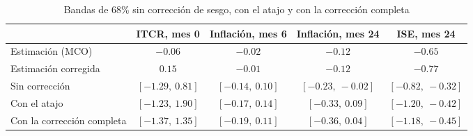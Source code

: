 \begin{table}[H]
\centering
\caption{Bandas de 68\% sin corrección de sesgo, con el atajo y con la corrección completa}
\label{tab:D_sesgo_completo}
\small
\begin{tabular}{@{}lcccc@{}}
\toprule
 & ITCR, mes 0 & Inflación, mes 6 & Inflación, mes 24 & ISE, mes 24 \\
\midrule
Estimación (MCO) & $-0.06$ & $-0.02$ & $-0.12$ & $-0.65$ \\
Estimación corregida & $0.15$ & $-0.01$ & $-0.12$ & $-0.77$ \\
\midrule
Sin corrección & $[-1.29,\ 0.81]$ & $[-0.14,\ 0.10]$ & $[-0.23,\ -0.02]$ & $[-0.82,\ -0.32]$ \\
Con el atajo & $[-1.23,\ 1.90]$ & $[-0.17,\ 0.14]$ & $[-0.33,\ 0.09]$ & $[-1.20,\ -0.42]$ \\
Con la corrección completa & $[-1.37,\ 1.35]$ & $[-0.19,\ 0.11]$ & $[-0.36,\ 0.04]$ & $[-1.18,\ -0.45]$ \\
\bottomrule
\end{tabular}
\end{table}
